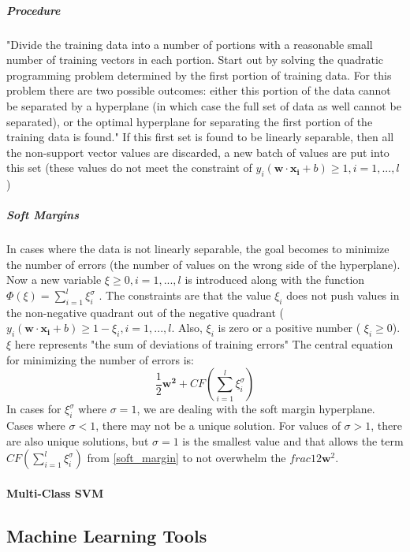 				\subparagraph{Procedure} "Divide the training data into a number of portions with a reasonable small number of training vectors in each portion.  Start out by solving the quadratic programming problem determined by the first portion of training data.  For this problem there are two possible outcomes: either this portion of the data cannot be separated by a hyperplane (in which case the full set of data as well cannot be separated), or the optimal hyperplane for separating the first portion of the training data is found." If this first set is found to be linearly separable, then all the non-support vector values are discarded, a new batch of values are put into this set (these values do not meet the constraint of $y_i(\mathbf{w} \cdot \mathbf{x_i} + b) \ge 1, i = 1,...,{l}$ )
				\subparagraph*{Soft Margins}
				In cases where the data is not linearly separable, the goal becomes to minimize the number of errors (the number of values on the wrong side of the hyperplane).  Now a new variable $\xi \ge 0, i=1,...,l$ is introduced along with the function $\Phi (\xi) = \sum_{i=1}^{l} \xi_{i}^{\sigma}$ .  The constraints are that the value 
				$\xi_i$ does not push values in the non-negative quadrant out of the negative quadrant ( $y_i(\mathbf{w} \cdot \mathbf{x_i} + b) \ge 1 - \xi_i, i=1,...,l$.  Also, $\xi_i$ is zero or a positive number ( $\xi_i \ge 0$).  $\xi$ here represents "the sum of deviations of training errors"
				The central equation for minimizing the number of errors is:
				\begin{equation}\label{soft_margin}  \frac{1}{2}\mathbf{w^2} + CF(\sum_{i=1}^{l} \xi_{i}^\sigma)\end{equation}
				In cases for $ \xi_{i}^{\sigma} $ where $\sigma=1$, we are dealing with the soft margin hyperplane.  Cases where $\sigma < 1$, there may not be a unique solution.  For values of $\sigma > 1$, there are also unique solutions, but $\sigma =1$ is the smallest value and that allows the term $CF(\sum_{i=1}^{l} \xi_{i}^\sigma)$ from \eqref{soft_margin} to not overwhelm  the $frac{1}{2}\mathbf{w}^2$.
			\paragraph{Multi-Class SVM}



	\subsection {Machine Learning Tools}

